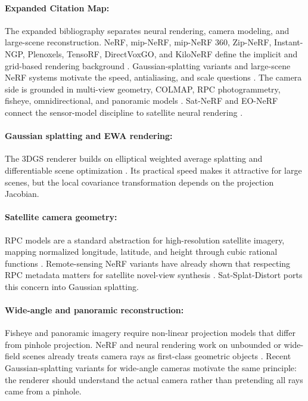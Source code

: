 \documentclass{article}
\begin{document}
\paragraph{Expanded Citation Map:}
The expanded bibliography separates neural rendering, camera modeling, and large-scene reconstruction. NeRF, mip-NeRF, mip-NeRF 360, Zip-NeRF, Instant-NGP, Plenoxels, TensoRF, DirectVoxGO, and KiloNeRF define the implicit and grid-based rendering background \citep{mildenhall2020nerf,barron2021mipnerf,barron2022mipnerf360,barron2023zipnerf,muller2022instant,fridovichkeil2022plenoxels,chen2022tensorf,sun2022directvoxgo,reiser2021kilonerf}. Gaussian-splatting variants and large-scene NeRF systems motivate the speed, antialiasing, and scale questions \citep{kerbl20233d,yu2024mipsplatting,lin2024scaffoldgs,tang2024vastgaussian,turki2022meganerf,xiangli2022bungeenerf,rematas2022urban}. The camera side is grounded in multi-view geometry, COLMAP, RPC photogrammetry, fisheye, omnidirectional, and panoramic models \citep{hartley2004multiple,schonberger2016sfm,schonberger2016mvs,tao2001rpc,grodecki2003block,kannala2006fisheye,scaramuzza2006omnidirectional,geyer2000catadioptric,mei2007singleviewpoint}. Sat-NeRF and EO-NeRF connect the sensor-model discipline to satellite neural rendering \citep{mar2022satnerf,mar2023eonerf}.


\paragraph{Gaussian splatting and EWA rendering:}
The 3DGS renderer builds on elliptical weighted average splatting and differentiable scene optimization \citep{zwicker2002ewa,kerbl20233d}. Its practical speed makes it attractive for large scenes, but the local covariance transformation depends on the projection Jacobian.

\paragraph{Satellite camera geometry:}
RPC models are a standard abstraction for high-resolution satellite imagery, mapping normalized longitude, latitude, and height through cubic rational functions \citep{tao2001rpc,grodecki2003block}. Remote-sensing NeRF variants have already shown that respecting RPC metadata matters for satellite novel-view synthesis \citep{mar2022satnerf,mar2023eonerf}. Sat-Splat-Distort ports this concern into Gaussian splatting.

\paragraph{Wide-angle and panoramic reconstruction:}
Fisheye and panoramic imagery require non-linear projection models that differ from pinhole projection. NeRF and neural rendering work on unbounded or wide-field scenes already treats camera rays as first-class geometric objects \citep{mildenhall2020nerf,barron2022mipnerf360}. Recent Gaussian-splatting variants for wide-angle cameras motivate the same principle: the renderer should understand the actual camera rather than pretending all rays came from a pinhole.
\end{document}
